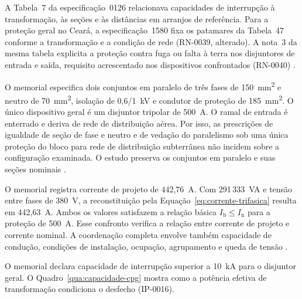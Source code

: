 A Tabela~7 da especificação~0126 relacionava capacidades de interrupção à transformação, às seções e às distâncias em arranjos de referência. Para a proteção geral no Ceará, a especificação~1580 fixa os patamares da Tabela~47 conforme a transformação e a condição de rede (RN-0039, alterado). A nota~3 da mesma tabela explicita a proteção contra fuga ou falta à terra nos disjuntores de entrada e saída, requisito acrescentado nos dispositivos confrontados (RN-0040) \cite[tabela~7]{enel0126}\cite[itens~7.22.6 e~7.25.2, tabela~47]{enel1580}.

O memorial especifica dois conjuntos em paralelo de três fases de 150~mm\textsuperscript{2} e neutro de 70~mm\textsuperscript{2}, isolação de 0,6/1~kV e condutor de proteção de 185~mm\textsuperscript{2}. O único dispositivo geral é um disjuntor tripolar de 500~A. O ramal de entrada é enterrado e deriva de rede de distribuição aérea. Por isso, as prescrições de igualdade de seção de fase e neutro e de vedação do paralelismo sob uma única proteção do bloco para rede de distribuição subterrânea não incidem sobre a configuração examinada. O estudo preserva os conjuntos em paralelo e suas seções nominais \cite[p.~1 e~7]{palatiummemorial2025}\cite[pranchas~003 e~005]{palatiumpranchas2025}\cite[item~7.19.6]{enel1580}.

O memorial registra corrente de projeto de 442,76~A. Com 291\,333~VA e tensão entre fases de 380~V, a reconstituição pela Equação~\ref{eq:corrente-trifasica} resulta em 442,63~A. Ambos os valores satisfazem a relação básica \(I_{\mathrm{b}}\leq I_{\mathrm{n}}\) para a proteção de 500~A. Esse confronto verifica a relação entre corrente de projeto e corrente nominal. A coordenação completa envolve também capacidade de condução, condições de instalação, ocupação, agrupamento e queda de tensão \cite[p.~7]{palatiummemorial2025}\cite[item~7.19.6, bloco de rede aérea]{enel1580}.

O memorial declara capacidade de interrupção superior a 10~kA para o disjuntor geral. O Quadro~\ref{qua:capacidade-cpg} mostra como a potência efetiva de transformação condiciona o desfecho (IP-0016).

